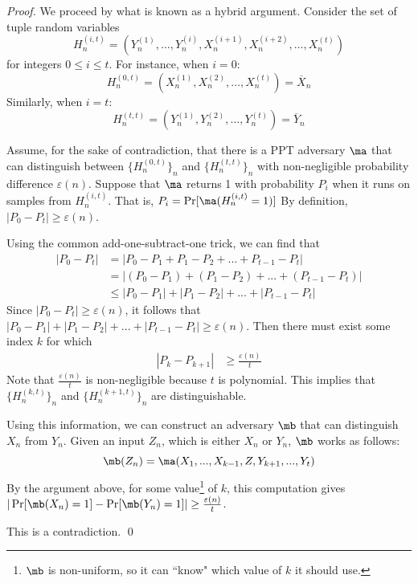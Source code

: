 \begin{proof}
We proceed by what is known as a hybrid argument.
Consider the set of tuple random variables
$$H^{(i,t)}_n = (Y_n^{(1)},\hdots,Y_n^{(i)},X_n^{(i+1)},X_n^{(i+2)},\hdots,X_n^{(t)})$$
for integers $0\le i\le t$. 
For instance, when $i=0$:
$$H^{(0,t)}_n = (X_n^{(1)},X_n^{(2)},\hdots,X_n^{(t)}) = \overline{X}_n$$
Similarly, when $i=t$:
$$H^{(t,t)}_n = (Y_n^{(1)},Y_n^{(2)},\hdots,Y_n^{(t)}) = \overline{Y}_n$$

Assume, for the sake of contradiction, that there is a PPT adversary $\ma$ that can distinguish between $\{H^{(0,t)}_n\}_n$ and $\{H^{(t,t)}_n\}_n$ with non-negligible probability difference $\varepsilon(n)$. Suppose that $\ma$ returns 1 with probability $P_i$ when it runs on samples from $H^{(i,t)}_n$. 
That is, $P_i = \Pr[\ma(H^{(i,t)}_n = 1)]$
By definition, $|P_0 - P_t|\ge \varepsilon(n)$. 

Using the common add-one-subtract-one trick, we can find that
\begin{align*}
|P_0 - P_t| &= |P_0 - P_{1} + P_{1} - P_{2} + ... + P_{t-1} - P_{t}| \\
&= |(P_0 - P_{1}) + (P_{1} - P_{2}) + ... + (P_{t-1} - P_{t})| \\
&\leq  |P_0 - P_{1}| + |P_{1} - P_{2}| + ... + |P_{t-1} - P_{t}|
\end{align*}
Since $|P_0 - P_t| \ge \varepsilon(n)$, it follows that $|P_0 - P_{1}| + |P_{1} - P_{2}| + ... + |P_{t-1} - P_{t}| \ge \varepsilon(n)$.
Then there must exist some index $k$ for which
\begin{align*}
|P_k - P_{k+1}| &\geq \frac{\varepsilon(n)}{t}
\end{align*}
Note that $\frac{\varepsilon(n)}{t}$ is non-negligible because $t$ is polynomial.
This implies that $\{H^{(k,t)}_n\}_n$ and $\{H^{(k+1,t)}_n\}_n$ are distinguishable.

Using this information, we can construct an adversary $\mb$ that can distinguish $X_n$ from $Y_n$.
Given an input $Z_n$, which is either $X_n$ or $Y_n$, $\mb$ works as follows:
$$\mb(Z_n) = \ma(X_1, ..., X_{k-1}, Z, Y_{k+1}, ..., Y_t)$$
By the argument above, for some value\footnote{$\mb$ is non-uniform, so it can ``know" which value of $k$ it should use.} of $k$, this computation gives $|\Pr[\mb(X_n)=1] - \Pr[\mb(Y_n) = 1]| \ge \frac{\varepsilon(n)}{t}$.


This is a contradiction. 
\qed


\end{proof}
